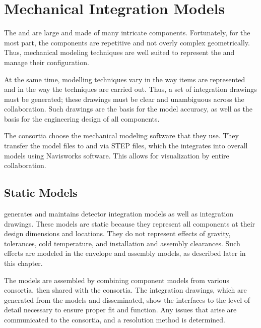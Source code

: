 \section{Mechanical Integration Models}
\label{sec:fdsp-coord-integ-models}

The  and   are large and made of many
intricate components. Fortunately, for the most part, the
components are repetitive and not overly complex
geometrically. Thus, \threed mechanical modeling techniques are well suited
to represent the  and manage their configuration.

At the same time, \threed modelling techniques vary in the way items are
represented and in the way the techniques are carried out. Thus, a set
of \twod integration drawings must be generated; these drawings must be
clear and unambiguous across the collaboration. Such \twod drawings are
the basis for the \threed model accuracy, as well as the basis for the engineering
design of all components.

The consortia choose the  mechanical modeling software that they use. %
They transfer the model files %
to  and 
via STEP files, which the %
 integrates  into overall models
using Navisworks software. This allows for visualization by entire
collaboration.

\subsection{Static Models}
\label{sec:fdsp-coord-integ-static}

 generates and maintains \threed detector integration models as
well as \twod integration drawings. These models are static because they
represent all components at their design dimensions and
locations. They do not represent effects of gravity, tolerances, cold
temperature, and installation and assembly clearances. Such effects are
modeled in the envelope and assembly models, as described later in this
chapter. 


The \threed models are assembled by combining component models from various
consortia, %
then shared with the consortia. The \twod integration drawings, which are generated from
the \threed models and disseminated, show the interfaces to the level of
detail necessary to ensure proper fit and function. Any issues that
arise are communicated to the consortia, and a resolution method is
determined. 


